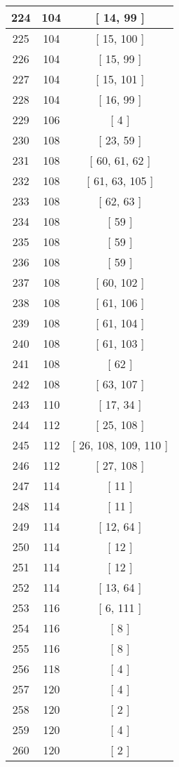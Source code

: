 \begin{center}
\begin{longtable}[H]{|| c c c ||}
224 & 104 & [ 14, 99 ]
\\\hline
225 & 104 & [ 15, 100 ]
\\\hline
226 & 104 & [ 15, 99 ]
\\\hline
227 & 104 & [ 15, 101 ]
\\\hline
228 & 104 & [ 16, 99 ]
\\\hline
229 & 106 & [ 4 ]
\\\hline
230 & 108 & [ 23, 59 ]
\\\hline
231 & 108 & [ 60, 61, 62 ]
\\\hline
232 & 108 & [ 61, 63, 105 ]
\\\hline
233 & 108 & [ 62, 63 ]
\\\hline
234 & 108 & [ 59 ]
\\\hline
235 & 108 & [ 59 ]
\\\hline
236 & 108 & [ 59 ]
\\\hline
237 & 108 & [ 60, 102 ]
\\\hline
238 & 108 & [ 61, 106 ]
\\\hline
239 & 108 & [ 61, 104 ]
\\\hline
240 & 108 & [ 61, 103 ]
\\\hline
241 & 108 & [ 62 ]
\\\hline
242 & 108 & [ 63, 107 ]
\\\hline
243 & 110 & [ 17, 34 ]
\\\hline
244 & 112 & [ 25, 108 ]
\\\hline
245 & 112 & [ 26, 108, 109, 110 ]
\\\hline
246 & 112 & [ 27, 108 ]
\\\hline
247 & 114 & [ 11 ]
\\\hline
248 & 114 & [ 11 ]
\\\hline
249 & 114 & [ 12, 64 ]
\\\hline
250 & 114 & [ 12 ]
\\\hline
251 & 114 & [ 12 ]
\\\hline
252 & 114 & [ 13, 64 ]
\\\hline
253 & 116 & [ 6, 111 ]
\\\hline
254 & 116 & [ 8 ]
\\\hline
255 & 116 & [ 8 ]
\\\hline
256 & 118 & [ 4 ]
\\\hline
257 & 120 & [ 4 ]
\\\hline
258 & 120 & [ 2 ]
\\\hline
259 & 120 & [ 4 ]
\\\hline
260 & 120 & [ 2 ]
\\\hline

\end{longtable}
\end{center}

